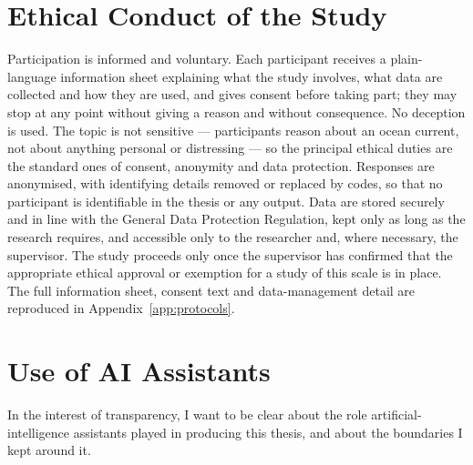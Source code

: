 \section{Ethical Conduct of the Study}
\label{app:ethics-conduct}

Participation is informed and voluntary. Each participant receives a plain-language information sheet explaining what the study involves, what data are collected and how they are used, and gives consent before taking part; they may stop at any point without giving a reason and without consequence. No deception is used. The topic is not sensitive --- participants reason about an ocean current, not about anything personal or distressing --- so the principal ethical duties are the standard ones of consent, anonymity and data protection. Responses are anonymised, with identifying details removed or replaced by codes, so that no participant is identifiable in the thesis or any output. Data are stored securely and in line with the General Data Protection Regulation, kept only as long as the research requires, and accessible only to the researcher and, where necessary, the supervisor. The study proceeds only once the supervisor has confirmed that the appropriate ethical approval or exemption for a study of this scale is in place. The full information sheet, consent text and data-management detail are reproduced in Appendix~\ref{app:protocols}.
\section{Use of AI Assistants}
\label{app:ai-use}

In the interest of transparency, I want to be clear about the role artificial-intelligence assistants played in producing this thesis, and about the boundaries I kept around it.

